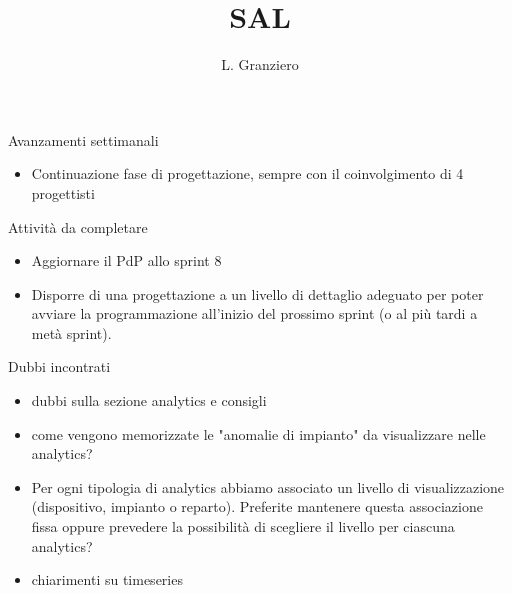 \documentclass{beamer}
\title{SAL}
\author[L. Granziero]{L. Granziero}
\begin{document}
{
  \begin{frame}
    \titlepage
  \end{frame}
}

\makeMembersFrame

\begin{frame}{Avanzamenti settimanali}
    \begin{itemize}
        \item Continuazione fase di progettazione, sempre con il coinvolgimento di 4 progettisti 
\end{itemize}
\end{frame}


\renewcommand{\precedentTodoEntries}{}


\makePrecedentTodoFrame


\begin{frame}{Attività da completare}
\begin{itemize}
    \item Aggiornare il PdP allo sprint 8
    \item Disporre di una progettazione a un livello di dettaglio adeguato per poter avviare la programmazione all’inizio del prossimo sprint (o al più tardi a metà sprint).
\end{itemize}
\end{frame}

\begin{frame}{Dubbi incontrati}
  \begin{itemize}
    \item dubbi sulla sezione analytics e consigli 
    \item come vengono memorizzate le "anomalie di impianto" da visualizzare nelle analytics? 
    \item Per ogni tipologia di analytics abbiamo associato un livello di visualizzazione (dispositivo, impianto o reparto). Preferite mantenere questa associazione fissa oppure prevedere la possibilità di scegliere il livello per ciascuna analytics?
    \item chiarimenti su timeseries
  \end{itemize}
\end{frame}
\end{document}
